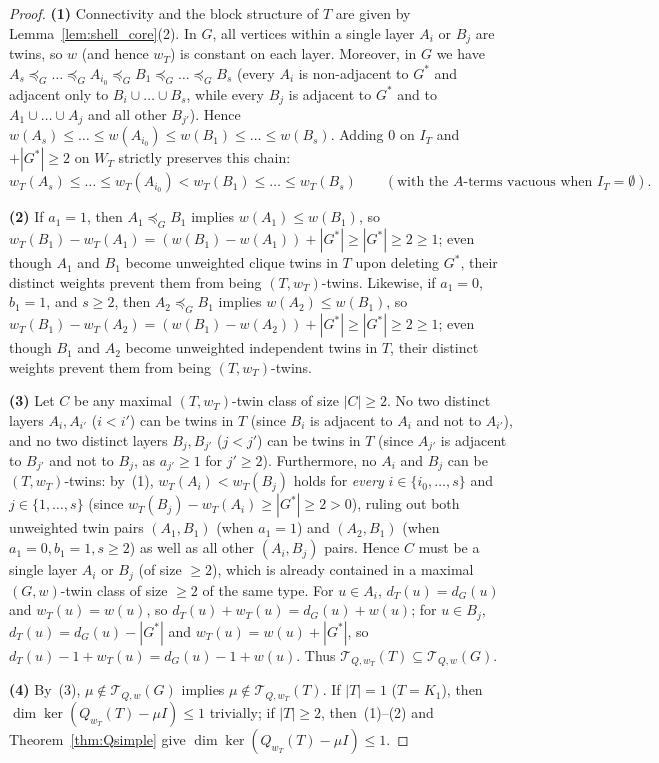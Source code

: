 \documentclass[11pt,a4paper]{article}
\theoremstyle{definition}
\begin{document}
\begin{proof}
  \textbf{(1)} Connectivity and the block structure of $T$ are given by Lemma~\ref{lem:shell_core}(2). In $G$, all vertices within a single layer $A_i$ or $B_j$ are twins, so $w$ (and hence $w_T$) is constant on each layer. Moreover, in $G$ we have $A_s \preceq_G \dots \preceq_G A_{i_0} \preceq_G B_1 \preceq_G \dots \preceq_G B_s$ (every $A_i$ is non-adjacent to $G^*$ and adjacent only to $B_i \cup \dots \cup B_s$, while every $B_j$ is adjacent to $G^*$ and to $A_1 \cup \dots \cup A_j$ and all other $B_{j'}$). Hence $w(A_s) \le \dots \le w(A_{i_0}) \le w(B_1) \le \dots \le w(B_s)$. Adding $0$ on $I_T$ and $+|G^*| \ge 2$ on $W_T$ strictly preserves this chain:
  \[
    w_T(A_s) \le \dots \le w_T(A_{i_0}) < w_T(B_1) \le \dots \le w_T(B_s) \qquad (\text{with the } A\text{-terms vacuous when } I_T = \emptyset).
  \]

  \textbf{(2)} If $a_1 = 1$, then $A_1 \preceq_G B_1$ implies $w(A_1) \le w(B_1)$, so $w_T(B_1) - w_T(A_1) = (w(B_1) - w(A_1)) + |G^*| \ge |G^*| \ge 2 \ge 1$; even though $A_1$ and $B_1$ become unweighted clique twins in $T$ upon deleting $G^*$, their distinct weights prevent them from being $(T, w_T)$-twins. Likewise, if $a_1 = 0$, $b_1 = 1$, and $s \ge 2$, then $A_2 \preceq_G B_1$ implies $w(A_2) \le w(B_1)$, so $w_T(B_1) - w_T(A_2) = (w(B_1) - w(A_2)) + |G^*| \ge |G^*| \ge 2 \ge 1$; even though $B_1$ and $A_2$ become unweighted independent twins in $T$, their distinct weights prevent them from being $(T, w_T)$-twins.

  \textbf{(3)} Let $C$ be any maximal $(T, w_T)$-twin class of size $|C| \ge 2$. No two distinct layers $A_i, A_{i'}$ ($i < i'$) can be twins in $T$ (since $B_i$ is adjacent to $A_i$ and not to $A_{i'}$), and no two distinct layers $B_j, B_{j'}$ ($j < j'$) can be twins in $T$ (since $A_{j'}$ is adjacent to $B_{j'}$ and not to $B_j$, as $a_{j'} \ge 1$ for $j' \ge 2$). Furthermore, no $A_i$ and $B_j$ can be $(T, w_T)$-twins: by~(1), $w_T(A_i) < w_T(B_j)$ holds for \emph{every} $i \in \{i_0,\dots,s\}$ and $j \in \{1,\dots,s\}$ (since $w_T(B_j) - w_T(A_i) \ge |G^*| \ge 2 > 0$), ruling out both unweighted twin pairs $(A_1, B_1)$ (when $a_1 = 1$) and $(A_2, B_1)$ (when $a_1 = 0, b_1 = 1, s \ge 2$) as well as all other $(A_i, B_j)$ pairs. Hence $C$ must be a single layer $A_i$ or $B_j$ (of size $\ge 2$), which is already contained in a maximal $(G, w)$-twin class of size $\ge 2$ of the same type. For $u \in A_i$, $d_T(u) = d_G(u)$ and $w_T(u) = w(u)$, so $d_T(u) + w_T(u) = d_G(u) + w(u)$; for $u \in B_j$, $d_T(u) = d_G(u) - |G^*|$ and $w_T(u) = w(u) + |G^*|$, so $d_T(u) - 1 + w_T(u) = d_G(u) - 1 + w(u)$. Thus $\mathcal{T}_{Q,w_T}(T) \subseteq \mathcal{T}_{Q,w}(G)$.

  \textbf{(4)} By~(3), $\mu \notin \mathcal{T}_{Q,w}(G)$ implies $\mu \notin \mathcal{T}_{Q,w_T}(T)$. If $|T| = 1$ ($T = K_1$), then $\dim\ker(Q_{w_T}(T) - \mu I) \le 1$ trivially; if $|T| \ge 2$, then~(1)--(2) and Theorem~\ref{thm:Qsimple} give $\dim\ker(Q_{w_T}(T) - \mu I) \le 1$.
\end{proof}
\end{document}
